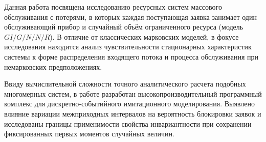 Данная работа посвящена исследованию ресурсных систем массового обслуживания с потерями, в которых каждая поступающая заявка занимает один обслуживающий прибор и случайный объём ограниченного ресурса (модель $GI/G/N/N/R$). В отличие от классических марковских моделей, в фокусе исследования находится анализ чувствительности стационарных характеристик системы к форме распределения входящего потока и процесса обслуживания при немарковских предположениях.

Ввиду вычислительной сложности точного аналитического расчета подобных многомерных систем, в работе разработан высокопроизводительный программный комплекс для дискретно-событийного имитационного моделирования. Выявлено влияние вариации межприходных интервалов на вероятность блокировки заявок и исследованы границы применимости свойства инвариантности при сохранении фиксированных первых моментов случайных величин.

